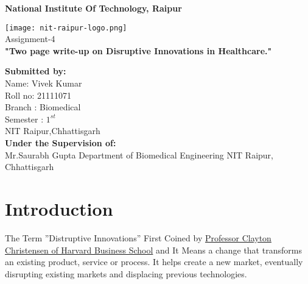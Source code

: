 \documentclass[12pt]{article}
\begin{document}
\pagestyle{empty}



   \begin{center}
       \vspace{1cm}
	   \Large
       \textbf{National Institute Of Technology, Raipur } 
       \vspace{1.5cm}
     
       \texttt{[image: nit-raipur-logo.png]}\\
       \vspace{0.8cm}
       \Huge
       Assignment-4\\
       \vspace{0.8cm}
      \textbf{ "Two page write-up on Disruptive Innovations in Healthcare."}
      
	\vfill      
      
   \begin{multicols}{2} 
   \begin{flushleft}
       \large
       \textbf{Submitted by:}\\
       Name: Vivek Kumar\\
       Roll no: 21111071\\
       Branch : Biomedical\\
       Semester : $1^{st}$ \\
       NIT Raipur,Chhattisgarh\\
       \columnbreak
       \textbf{Under the Supervision of:}\\
       Mr.Saurabh Gupta
       Department of Biomedical Engineering
       NIT Raipur, Chhattisgarh
    \end{flushleft}
    \end{multicols}    
            
   \end{center}

\clearpage
\pagestyle{fancy}
\tableofcontents
\clearpage
\section{Introduction}
The Term ''Distruptive Innovations'' First Coined by \href{https://hbr.org/2015/12/what-is-disruptive-innovation}{Professor Clayton Christensen of Harvard Business School} and It Means a change that transforms an existing product, service or process. It helps create a new market, eventually disrupting existing markets and displacing previous technologies. 
\end{document}
